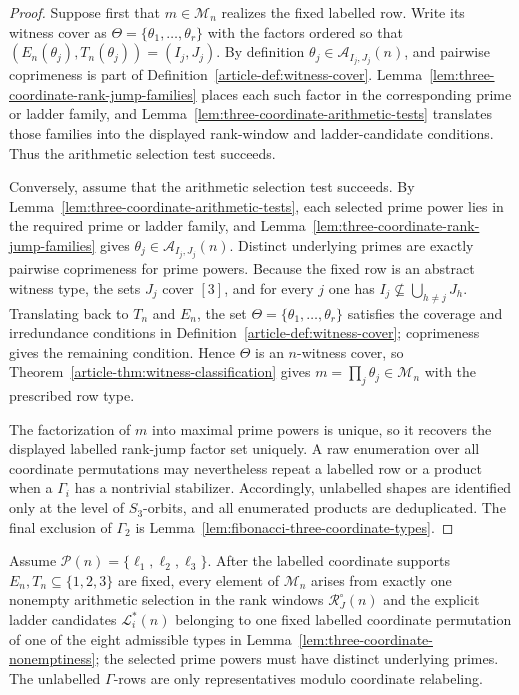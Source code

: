 \begin{proof}
Suppose first that $m\in\mathcal M_n$ realizes the fixed labelled row. Write its witness cover as
$\Theta=\{\theta_1,\dots,\theta_r\}$ with the factors ordered so that
$(E_n(\theta_j),T_n(\theta_j))=(I_j,J_j)$. By definition
$\theta_j\in\mathcal A_{I_j,J_j}(n)$, and pairwise coprimeness is part of
Definition~\ref{article-def:witness-cover}. Lemma~\ref{lem:three-coordinate-rank-jump-families}
places each such factor in the corresponding prime or ladder family, and
Lemma~\ref{lem:three-coordinate-arithmetic-tests} translates those
families into the displayed rank-window and ladder-candidate conditions. Thus
the arithmetic selection test succeeds.

Conversely, assume that the arithmetic selection test succeeds. By
Lemma~\ref{lem:three-coordinate-arithmetic-tests}, each selected
prime power lies in the required prime or ladder family, and
Lemma~\ref{lem:three-coordinate-rank-jump-families} gives
$\theta_j\in\mathcal A_{I_j,J_j}(n)$. Distinct underlying primes are exactly
pairwise coprimeness for prime powers. Because the fixed row is an abstract
witness type, the sets $J_j$ cover $[3]$, and for every $j$ one has
$I_j\nsubseteq\bigcup_{h\ne j}J_h$. Translating back to $T_n$ and $E_n$, the
set $\Theta=\{\theta_1,\dots,\theta_r\}$ satisfies the coverage and
irredundance conditions in Definition~\ref{article-def:witness-cover}; coprimeness
gives the remaining condition. Hence $\Theta$ is an $n$-witness cover, so
Theorem~\ref{article-thm:witness-classification} gives
$m=\prod_j\theta_j\in\mathcal M_n$ with the prescribed row type.

The factorization of $m$ into maximal prime powers is unique, so it recovers
the displayed labelled rank-jump factor set uniquely. A raw enumeration over all
coordinate permutations may nevertheless repeat a labelled row or a product
when a $\Gamma_i$ has a nontrivial stabilizer. Accordingly, unlabelled shapes
are identified only at the level of $S_3$-orbits, and all enumerated products
are deduplicated. The final exclusion of $\Gamma_2$ is
Lemma~\ref{lem:fibonacci-three-coordinate-types}.
\end{proof}

\begin{lemma}\label{lem:three-coordinate-realization}
Assume $\mathcal P(n)=\{\ell_1,\ell_2,\ell_3\}$. After the labelled coordinate
supports $E_n,T_n\subseteq\{1,2,3\}$ are fixed, every element of
$\mathcal M_n$ arises from exactly one nonempty arithmetic selection in the
rank windows $\mathcal R_J^\circ(n)$ and the explicit ladder candidates
$\mathcal L_i^*(n)$ belonging to one fixed labelled coordinate permutation of
one of the eight admissible types in
Lemma~\ref{lem:three-coordinate-nonemptiness}; the selected prime powers
must have distinct underlying primes. The unlabelled $\Gamma$-rows are only
representatives modulo coordinate relabeling.
\end{lemma}

